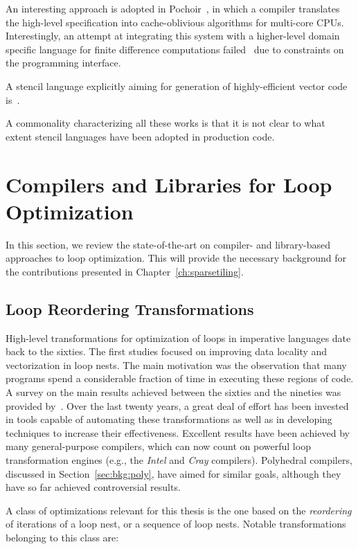 An interesting approach is adopted in Pochoir~\cite{pochoir}, in which a compiler translates the high-level specification into cache-oblivious algorithms for multi-core CPUs. Interestingly, an attempt at integrating this system with a higher-level domain specific language for finite difference computations failed~\cite{tj-thesis} due to constraints on the programming interface. 

A stencil language explicitly aiming for generation of highly-efficient vector code is~\cite{stencil-compiler}.

A commonality characterizing all these works is that it is not clear to what extent stencil languages have been adopted in production code. 


\section{Compilers and Libraries for Loop Optimization}
\label{sec:bkg:codeopt}
In this section, we review the state-of-the-art on compiler- and library-based approaches to loop optimization. This will provide the necessary background for the contributions presented in Chapter~\ref{ch:sparsetiling}.

\subsection{Loop Reordering Transformations}
\label{sec:bkg:loop-transf}
High-level transformations for optimization of loops in imperative languages date back to the sixties. The first studies focused on improving data locality and vectorization in loop nests. The main motivation was the observation that many programs spend a considerable fraction of time in executing these regions of code. A survey on the main results achieved between the sixties and the nineties was provided by~\cite{bacon-comp-transf}. Over the last twenty years, a great deal of effort has been invested in tools capable of automating these transformations as well as in developing techniques to increase their effectiveness. Excellent results have been achieved by many general-purpose compilers, which can now count on powerful loop transformation engines (e.g., the {\em Intel} and {\em Cray} compilers). Polyhedral compilers, discussed in Section~\ref{sec:bkg:poly}, have aimed for similar goals, although they have so far achieved controversial results.

A class of optimizations relevant for this thesis is the one based on the {\em reordering} of iterations of a loop nest, or a sequence of loop nests. Notable transformations belonging to this class are:

